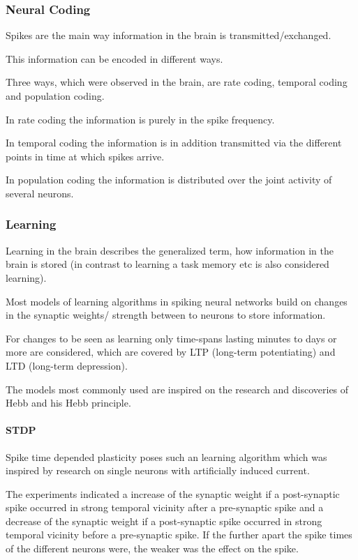 \subsubsection{Neural Coding}

Spikes are the main way information in the brain is transmitted/exchanged.

This information can be encoded in different ways.

Three ways, which were observed in the brain, are rate coding, temporal coding and population coding.

In rate coding the information is purely in the spike frequency.

In temporal coding the information is in addition transmitted via the different points in time at which spikes arrive.

In population coding the information is distributed over the joint activity of several neurons.  

\subsubsection{Learning}

Learning in the brain describes the generalized term, how information in the brain is stored (in contrast to learning a task memory etc is also considered learning).

Most models of learning algorithms in spiking neural networks build on changes in the synaptic weights/ strength between to neurons to store information.

For changes to be seen as learning only time-spans lasting minutes to days or more are considered, which are covered by LTP (long-term potentiating) and LTD (long-term depression).
 
The models most commonly used are inspired on the research and discoveries of Hebb and his Hebb principle.

\paragraph{STDP}

Spike time depended plasticity poses such an learning algorithm which was inspired by research on single neurons with artificially induced current.

The experiments indicated a increase of the synaptic weight if a post-synaptic spike occurred in strong temporal vicinity after a pre-synaptic spike and a decrease of the synaptic weight if a post-synaptic spike occurred in strong temporal vicinity before a pre-synaptic spike.
If the further apart the spike times of the different neurons were, the weaker was the effect on the spike.


